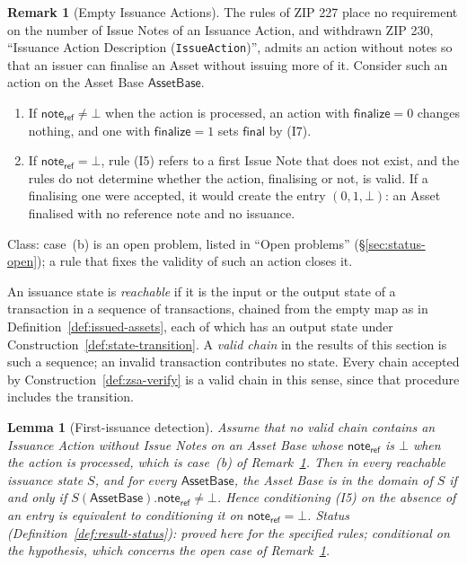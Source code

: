\documentclass[11pt,a4paper]{article}
\newtheorem{lemma}[theorem]{Lemma}
\theoremstyle{definition}
\newtheorem{remark}[theorem]{Remark}
\begin{document}
\begin{remark}[Empty Issuance Actions]\label{rem:empty-action}
The rules of ZIP 227 place no requirement on the number of Issue Notes of an
Issuance Action, and withdrawn ZIP 230, ``Issuance Action Description
(\texttt{IssueAction})'', admits an action without notes so that an issuer
can finalise an Asset without issuing more of it. Consider such an action on
the Asset Base $\mathsf{AssetBase}$.
\begin{enumerate}[label=(\alph*)]
\item If $\mathsf{note}_{\mathsf{ref}} \neq \bot$ when the action is
  processed, an action with $\mathsf{finalize} = 0$ changes nothing, and one
  with $\mathsf{finalize} = 1$ sets $\mathsf{final}$ by (I7).
\item If $\mathsf{note}_{\mathsf{ref}} = \bot$, rule (I5) refers to a first
  Issue Note that does not exist, and the rules do not determine whether the
  action, finalising or not, is valid. If a finalising one were accepted, it
  would create the entry $(0, 1, \bot)$: an Asset finalised with no
  reference note and no issuance.
\end{enumerate}
Class: case~(b) is an open problem, listed in ``Open problems''
(\S\ref{sec:status-open}); a rule that fixes the validity of such an action
closes it.
\end{remark}

An issuance state is \emph{reachable} if it is the input or the output state
of a transaction in a sequence of transactions, chained from the empty map as
in Definition~\ref{def:issued-assets}, each of which has an output state
under Construction~\ref{def:state-transition}. A \emph{valid chain} in the
results of this section is such a sequence; an invalid transaction
contributes no state. Every chain accepted by
Construction~\ref{def:zsa-verify} is a valid chain in this sense, since that
procedure includes the transition.

\begin{lemma}[First-issuance detection]\label{lem:first-issuance}
Assume that no valid chain contains an Issuance Action without Issue Notes
on an Asset Base whose $\mathsf{note}_{\mathsf{ref}}$ is $\bot$ when the
action is processed, which is case~(b) of Remark~\ref{rem:empty-action}.
Then in every reachable issuance state $S$, and for every
$\mathsf{AssetBase}$, the Asset Base is in the domain of $S$ if and only if
$S(\mathsf{AssetBase}).\mathsf{note}_{\mathsf{ref}} \neq \bot$. Hence
conditioning (I5) on the absence of an entry is equivalent to conditioning it
on $\mathsf{note}_{\mathsf{ref}} = \bot$. Status
(Definition~\ref{def:result-status}): proved here for the specified rules;
conditional on the hypothesis, which concerns the open case of
Remark~\ref{rem:empty-action}.
\end{lemma}
\end{document}
